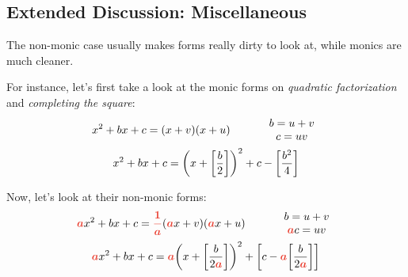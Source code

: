 
\newpage
\subsection{Extended Discussion: Miscellaneous}%
\label{sub:extrasecmath-disc-misc}

\begin{multicols}{2}

    \begin{CheatsheetEntryFrame}


        The non-monic case usually makes forms really dirty to look at, while monics are much cleaner.
        
        For instance, let's first take a look at the monic forms on \textit{quadratic factorization} and \textit{completing the square}:
        \begin{gather*}
            x^2 + bx + c = \parens*{x + v} \parens*{x + u}
                \qquad\quad
                \begin{array}{c}
                    b = u+v \\
                    c = uv
                \end{array}
                \\
            x^2 + bx + c = \parens*{x + \brackets*{\frac{b}{2}}}^2 + c - \brackets*{\frac{b^2}{4}}
        \end{gather*}

        Now, let's look at their non-monic forms:
        \begin{gather*}
            \memphR{a} x^2 + bx + c = \memphR{\frac{1}{a}} \parens*{\memphR{a} x + v} \parens*{\memphR{a} x + u}
                \qquad\quad
                \begin{array}{c}
                    b = u+v \\
                    \memphR{a} c = uv
                \end{array}
                \\
            \memphR{a} x^2 + bx + c = \memphR{a} \parens*{x + \brackets*{\frac{b}{2\memphR{a}}}}^2 + \brackets*{c - \memphR{a} \brackets*{\frac{b}{2 \memphR{a}}}}
        \end{gather*}


\end{CheatsheetEntryFrame}
\end{multicols}
